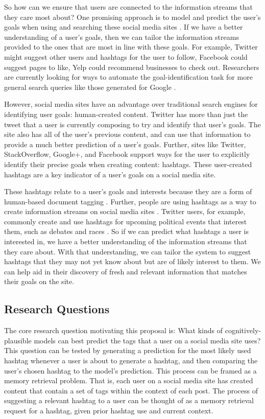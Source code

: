 \documentclass[man,floatsintext,donotrepeattitle]{apa6}
\begin{document}
So how can we ensure that users are connected to the information streams that they care most about?
One promising approach is to model and predict the user's goals when using and searching these social media sites \parencite{Rose2004}.
If we have a better understanding of a user's goals, then we can tailor the information streams provided to the ones that are most in line with these goals.
For example, Twitter might suggest other users and hashtags for the user to follow, Facebook could suggest pages to like, Yelp could recommend businesses to check out.
Researchers are currently looking for ways to automate the goal-identification task for more general search queries like those generated for Google \parencites{Jansen2008}{Lee2005}.

However, social media sites have an advantage over traditional search engines for identifying user goals: human-created content.
Twitter has more than just the tweet that a user is currently composing to try and identify that user's goals.
The site also has all of the user's previous content, and can use that information to provide a much better prediction of a user's goals.
Further, sites like Twitter, StackOverflow, Google+, and Facebook support ways for the user to explicitly identify their precise goals when creating content: hashtags.
These user-created hashtags are a key indicator of a user's goals on a social media site. 

These hashtags relate to a user's goals and interests because they are a form of human-based document tagging \parencite{Chang2010}.
Further, people are using hashtags as a way to create information streams on social media sites \parencite{Kwak2010}.
Twitter users, for example, commonly create and use hashtags for upcoming political events that interest them, such as debates and races \parencite{Diakopoulos2010}.
So if we can predict what hashtags a user is interested in, we have a better understanding of the information streams that they care about.
With that understanding, we can tailor the system to suggest hashtags that they may not yet know about but are of likely interest to them.
We can help aid in their discovery of fresh and relevant information that matches their goals on the site.

\subsection{Research Questions}

The core research question motivating this proposal is:
What kinds of cognitively-plausible models can best predict the tags that a user on a social media site uses?
This question can be tested by generating a prediction for the most likely used hashtag whenever a user is about to generate a hashtag, and then comparing the user's chosen hashtag to the model's prediction.
This process can be framed as a memory retrieval problem.
That is, each user on a social media site has created content that contain a set of tags within the context of each post.
The process of suggesting a relevant hashtag to a user can be thought of as a memory retrieval request for a hashtag, given prior hashtag use and current context.
\end{document}
